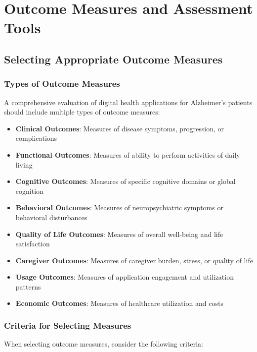 \chapter{Outcome Measures and Assessment Tools}

\section{Selecting Appropriate Outcome Measures}
\subsection{Types of Outcome Measures}
A comprehensive evaluation of digital health applications for Alzheimer's patients should include multiple types of outcome measures:

\begin{itemize}
    \item \textbf{Clinical Outcomes}: Measures of disease symptoms, progression, or complications
    \item \textbf{Functional Outcomes}: Measures of ability to perform activities of daily living
    \item \textbf{Cognitive Outcomes}: Measures of specific cognitive domains or global cognition
    \item \textbf{Behavioral Outcomes}: Measures of neuropsychiatric symptoms or behavioral disturbances
    \item \textbf{Quality of Life Outcomes}: Measures of overall well-being and life satisfaction
    \item \textbf{Caregiver Outcomes}: Measures of caregiver burden, stress, or quality of life
    \item \textbf{Usage Outcomes}: Measures of application engagement and utilization patterns
    \item \textbf{Economic Outcomes}: Measures of healthcare utilization and costs
\end{itemize}

\subsection{Criteria for Selecting Measures}
When selecting outcome measures, consider the following criteria:

